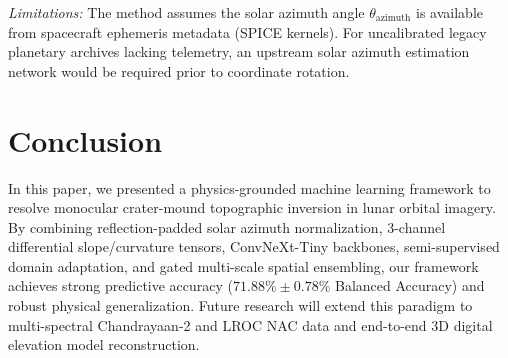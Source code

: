 \documentclass[10pt,journal,compsoc]{IEEEtran}
\theoremstyle{definition}
\begin{document}
\textit{Limitations:} The method assumes the solar azimuth angle $\theta_{\text{azimuth}}$ is available from spacecraft ephemeris metadata (SPICE kernels). For uncalibrated legacy planetary archives lacking telemetry, an upstream solar azimuth estimation network would be required prior to coordinate rotation.

\section{Conclusion}
In this paper, we presented a physics-grounded machine learning framework to resolve monocular crater-mound topographic inversion in lunar orbital imagery. By combining reflection-padded solar azimuth normalization, 3-channel differential slope/curvature tensors, ConvNeXt-Tiny backbones, semi-supervised domain adaptation, and gated multi-scale spatial ensembling, our framework achieves strong predictive accuracy ($71.88\% \pm 0.78\%$ Balanced Accuracy) and robust physical generalization. Future research will extend this paradigm to multi-spectral Chandrayaan-2 and LROC NAC data and end-to-end 3D digital elevation model reconstruction.



\end{document}
